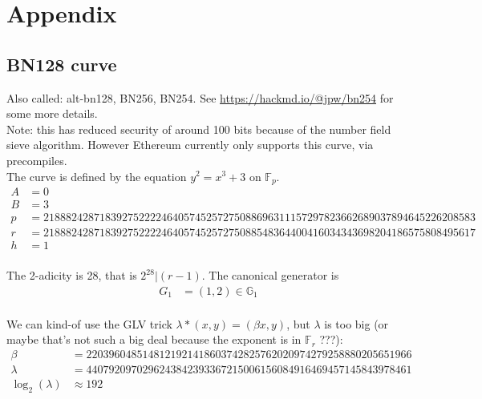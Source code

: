\documentclass[12pt,draft,a4paper,openany,oneside]{amsbook}
\def\F{\mathbb{F}}
\def\G{\mathbb{G}}
\theoremstyle{plain}
\theoremstyle{definition}
\begin{document}

\chapter{Appendix}

\section{BN128 curve}

Also called: alt-bn128, BN256, BN254.
See \url{https://hackmd.io/@jpw/bn254} for some more details. \\

Note: this has reduced security of around 100 bits because of the number field sieve
algorithm. However Ethereum currently only supports this curve, via precompiles.\\

The curve is defined by the equation $y^2 = x^3 + 3$ on $\F_p$.
\begin{align*}
A &= 0 \\
B &= 3 \\
p &= 21888242871839275222246405745257275088696311157297823662689037894645226208583 \\
r &= 21888242871839275222246405745257275088548364400416034343698204186575808495617 \\
h &= 1 \\
\end{align*}

The 2-adicity is 28, that is $2^{28} | (r-1)$. The canonical generator is
\begin{align*}
G_1 &= (1,2)\in\G_1  \\
\end{align*}

We can kind-of use the GLV trick $\lambda*(x,y)=(\beta x,y)$, but $\lambda$ is too big
(or maybe that's not such a big deal because the exponent is in $\F_r$ ???):
\begin{align*}
\beta   &= 2203960485148121921418603742825762020974279258880205651966 \\
\lambda &= 4407920970296243842393367215006156084916469457145843978461 \\
\log_2(\lambda) &\approx 192 \\
\end{align*}

\end{document}

